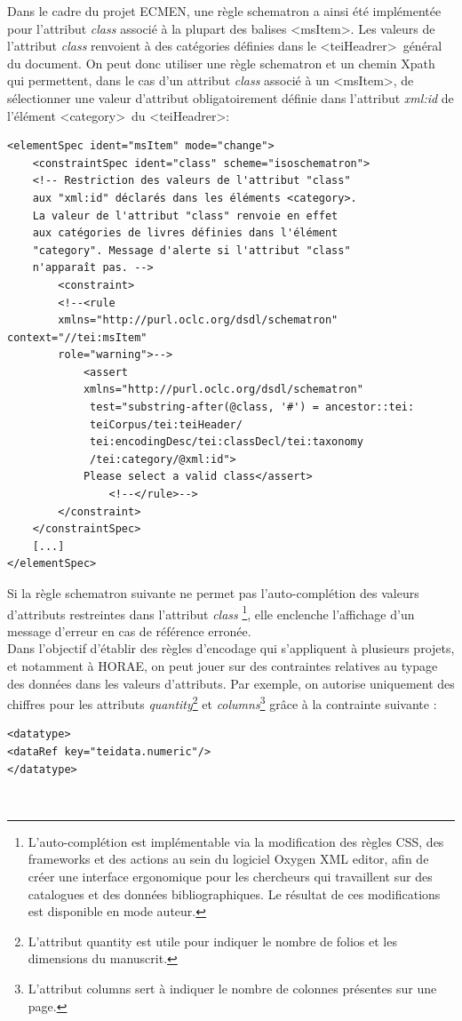 \documentclass[a4paper,12pt,twoside]{book}
\begin{document}
	Dans le cadre du projet ECMEN, une règle schematron a ainsi été implémentée pour l'attribut \textit{class} associé à la plupart des balises \textless msItem\textgreater . Les valeurs de l'attribut \textit{class} renvoient à des catégories définies dans le \textless teiHeadrer\textgreater~général du document. On peut donc utiliser une règle schematron et un chemin Xpath qui permettent, dans le cas d'un attribut \textit{class} associé à un \textless msItem\textgreater, de sélectionner une valeur d'attribut obligatoirement définie dans l'attribut \textit{xml:id} de l'élément \textless category\textgreater~du \textless teiHeadrer\textgreater : 
	\begin{verbatim}
<elementSpec ident="msItem" mode="change">
    <constraintSpec ident="class" scheme="isoschematron">
    <!-- Restriction des valeurs de l'attribut "class" 
    aux "xml:id" déclarés dans les éléments <category>. 
    La valeur de l'attribut "class" renvoie en effet 
    aux catégories de livres définies dans l'élément 
    "category". Message d'alerte si l'attribut "class" 
    n'apparaît pas. -->
        <constraint>
        <!--<rule 
        xmlns="http://purl.oclc.org/dsdl/schematron" context="//tei:msItem" 
        role="warning">-->
            <assert 
            xmlns="http://purl.oclc.org/dsdl/schematron" 
             test="substring-after(@class, '#') = ancestor::tei:
             teiCorpus/tei:teiHeader/
             tei:encodingDesc/tei:classDecl/tei:taxonomy
             /tei:category/@xml:id">
            Please select a valid class</assert> 
                <!--</rule>-->
        </constraint>
    </constraintSpec>
    [...]
</elementSpec>
	\end{verbatim}
	Si la règle schematron suivante ne permet pas l'auto-complétion des valeurs d’attributs restreintes dans l’attribut \textit{class} {}\footnote{L'auto-complétion est implémentable via la modification des règles CSS, des frameworks et des actions au sein du logiciel Oxygen XML editor, afin de créer une interface ergonomique pour les chercheurs qui travaillent sur des catalogues et des données bibliographiques. Le résultat de ces modifications est disponible en mode auteur.}, elle enclenche l'affichage d'un message d’erreur en cas de référence erronée.\\
	
	Dans l'objectif d'établir des règles d'encodage qui s'appliquent à plusieurs projets, et notamment à HORAE, on peut jouer sur des contraintes relatives au typage des données dans les valeurs d'attributs. Par exemple, on autorise uniquement des chiffres pour les attributs \textit{quantity}\footnote{L'attribut quantity est utile pour indiquer le nombre de folios et les dimensions du manuscrit.} et \textit{columns}\footnote{L'attribut columns sert à indiquer le nombre de colonnes présentes sur une page.} grâce à la contrainte suivante : 
	\begin{verbatim}
<datatype>
<dataRef key="teidata.numeric"/>
</datatype>
	\end{verbatim}\\
	
\end{document}
